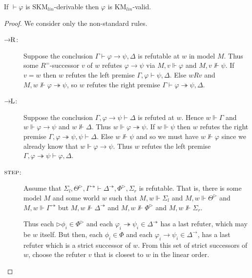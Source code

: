 \documentclass[envcountsect,envcountsame]{llncs}
\newcommand{\forces}{\Vdash}
\newcommand{\iimp}{\twoheadrightarrow}
\newcommand{\lcnxt}{\mathrm{KM}_{lin}}
\newcommand{\limp}{\rightarrow}
\newcommand{\nxt}{\rhd}
\newcommand{\opset}[2]{{#2}^{#1}}
\newcommand{\rel}{R}
\newcommand{\releq}{R^{=}}
\newcommand{\seq}{\vdash}
\newcommand{\seqlcnxt}{\mathrm{SKM}_{lin}}
\newcommand{\impleftrulename}{\small \limp\!\!\mathrm{L}}
\newcommand{\imprightrulename}{\small \limp\!\!\mathrm{R}}
\newcommand{\steprulename}{\textsc{step}}
\begin{document}
\begin{theorem}[Soundness]\label{thm:soundness}
If
$\seq \varphi$
  is $\seqlcnxt$-derivable then 
$\varphi$ is $\lcnxt$-valid.
\end{theorem}
\begin{proof}
We consider only the non-standard rules.
  \begin{description}
  \item[$\imprightrulename$:] 
  Suppose the conclusion
  $\Gamma \seq \varphi \limp \psi, \Delta $ is refutable
  at $w$ in model $M$.
  Thus some $\releq$-successor $v$ of $w$ refutes
  $\varphi \limp \psi$ via
  $M, v \forces \varphi$ and
  $M, v \not\forces \psi$.
  If
  $v=w$ then
  $w$ refutes the left premise
  $\Gamma, \varphi \seq \psi, \Delta$.
  Else $w \rel v$ and 
  $M, w \not\forces \varphi\iimp\psi$,
  so $w$ refutes the right premise
  $\Gamma \seq \varphi \iimp \psi, \Delta$.
  \item[$\impleftrulename$:] 
  Suppose the conclusion 
  $\Gamma, \varphi\limp\psi \seq \Delta$
  is refuted at $w$. 
  Hence
  $w \forces \Gamma$ and
  $w \forces \varphi\limp\psi$ and
  $w \not\forces \Delta$.
  Thus
  $w \forces \varphi\iimp\psi$.
  If 
  $w \forces \psi$ 
  then 
  $w$ refutes the right premise
  $\Gamma, \varphi\iimp\psi, \psi \seq \Delta$.
  Else
  $w \not\forces \psi$ 
  and so we must have
  $w \not\forces \varphi$
  since we already know that
  $w \forces \varphi\limp\psi$.
  Thus $w$ refutes the left premise
  $\Gamma, \varphi\iimp\psi \seq \varphi, \Delta$.
  
  \item[\rm $\steprulename$:] Assume that
     $\Sigma_l, 
      \opset{\nxt}{\Theta},
      \opset{\iimp}{\Gamma}
      \seq
      \opset{\iimp}{\Delta},
      \opset{\nxt}{\Phi},
      \Sigma_r$
     is refutable.
     That is, there is some model $M$ and some world $w$ such
     that 
    $M, w \forces \Sigma_l$ and
    $M, w \forces \opset{\nxt}{\Theta}$ and
    $M, w \forces \opset{\iimp}{\Gamma}$ 
    but 
    $M, w \not\forces \opset{\iimp}{\Delta}$ 
    and
    $M, w \not\forces \opset{\nxt}{\Phi}$ 
    and
    $M, w \not\forces \Sigma_r$.

    Thus each $\nxt\phi_i \in \opset{\nxt}{\Phi}$
    and
    each $\varphi_i \iimp \psi_i \in \opset{\iimp}{\Delta}$
    has a last
    refuter, which may be $w$ itself.
    But then, 
    each $\phi_i \in \Phi$ and
    each $\varphi_i \limp \psi_i \in \opset{\limp}{\Delta}$,
    has a last
    refuter which 
    is a strict successor of $w$.
    From this set of strict successors of $w$,
    choose the refuter $v$  that is
    closest to $w$ in the linear order.


\end{description}
\end{proof}
\end{document}
